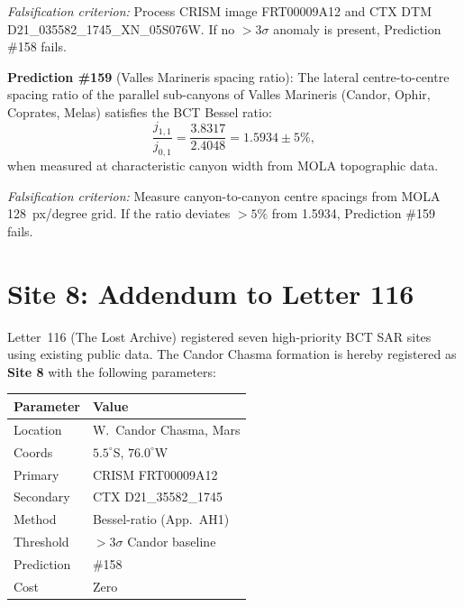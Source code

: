 \documentclass[12pt,twocolumn]{article}
\begin{document}
\textit{Falsification criterion:} Process CRISM image FRT00009A12
and CTX DTM D21\_035582\_1745\_XN\_05S076W. If no $>3\sigma$
anomaly is present, Prediction \#158 fails.

\bigskip
\noindent\textbf{Prediction \#159} (Valles Marineris spacing ratio):
The lateral centre-to-centre spacing ratio of the parallel
sub-canyons of Valles Marineris (Candor, Ophir, Coprates, Melas)
satisfies the BCT Bessel ratio:
\begin{equation}
  \frac{j_{1,1}}{j_{0,1}} = \frac{3.8317}{2.4048} = 1.5934 \pm 5\%,
\end{equation}
when measured at characteristic canyon width from MOLA topographic
data.

\textit{Falsification criterion:} Measure canyon-to-canyon centre
spacings from MOLA 128~px/degree grid. If the ratio deviates
$>5\%$ from 1.5934, Prediction \#159 fails.

\section{Site 8: Addendum to Letter 116}

Letter~116 (The Lost Archive) registered seven high-priority BCT
SAR sites using existing public data. The Candor Chasma formation
is hereby registered as \textbf{Site 8} with the following parameters:

\begin{center}
{\small
\begin{tabular}{@{}p{2cm}p{3.3cm}@{}}
\toprule
Parameter & Value \\
\midrule
Location & W.\ Candor Chasma, Mars \\
Coords & $5.5^\circ$S, $76.0^\circ$W \\
Primary & CRISM FRT00009A12 \\
Secondary & CTX D21\_35582\_1745 \\
Method & Bessel-ratio (App.\ AH1) \\
Threshold & $>3\sigma$ Candor baseline \\
Prediction & \#158 \\
Cost & Zero \\
\bottomrule
\end{tabular}}
\end{center}

\end{document}
